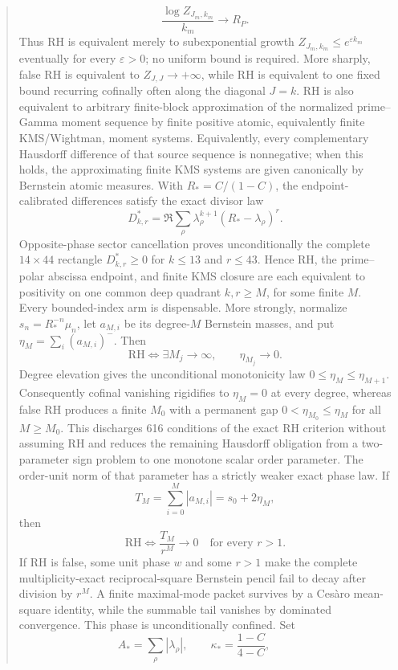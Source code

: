\documentclass[11pt]{article}
\begin{document}
\begin{abstract}
\[
 \frac{\log Z_{J_m,k_m}}{k_m}\longrightarrow R_P.
\]
Thus RH is equivalent merely to subexponential growth
$Z_{J_m,k_m}\le e^{\varepsilon k_m}$ eventually for every $\varepsilon>0$; no uniform bound is
required.  More sharply, false RH is equivalent to \(Z_{J,J}\to+\infty\), while RH is equivalent
to one fixed bound recurring cofinally often along the diagonal \(J=k\).  RH is also equivalent
to arbitrary finite-block
approximation of the normalized prime--Gamma moment sequence by finite positive atomic,
equivalently finite KMS/Wightman, moment systems.  Equivalently, every complementary Hausdorff
difference of that source sequence is nonnegative; when this holds, the approximating finite KMS
systems are given canonically by Bernstein atomic measures.  With $R_*=C/(1-C)$, the
endpoint-calibrated differences satisfy the exact divisor law
\[
 D^*_{k,r}=\Re\sum_\rho
 \lambda_\rho^{k+1}(R_*-\lambda_\rho)^r.
\]
Opposite-phase sector cancellation proves unconditionally the complete $14\times44$ rectangle
$D^*_{k,r}\ge0$ for $k\le13$ and $r\le43$.  Hence RH, the prime--polar abscissa endpoint, and
finite KMS closure are each equivalent to positivity on one common deep quadrant $k,r\ge M$, for
some finite $M$.  Every bounded-index arm is dispensable.  More strongly, normalize
$s_n=R_*^{-n}\mu_n$, let $a_{M,i}$ be its degree-$M$ Bernstein masses, and put
$\eta_M=\sum_i(a_{M,i})^-$.  Then
\[
 \mathrm{RH}\Longleftrightarrow
 \exists M_j\to\infty,\qquad \eta_{M_j}\longrightarrow0.
\]
Degree elevation gives the unconditional monotonicity law $0\le\eta_M\le\eta_{M+1}$.
Consequently cofinal vanishing rigidifies to $\eta_M=0$ at every degree, whereas false RH
produces a finite $M_0$ with a permanent gap
$0<\eta_{M_0}\le\eta_M$ for all $M\ge M_0$.  This discharges 616 conditions of the exact RH
criterion without assuming RH and reduces the remaining Hausdorff obligation from a
two-parameter sign problem to one monotone scalar order parameter.  The order-unit norm of that
parameter has a strictly weaker exact phase law.  If
\[
 T_M=\sum_{i=0}^M|a_{M,i}|=s_0+2\eta_M,
\]
then
\[
 \mathrm{RH}\Longleftrightarrow
 \frac{T_M}{r^M}\longrightarrow0\quad\text{for every }r>1.
\]
If RH is false, some unit phase $w$ and some $r>1$ make the complete multiplicity-exact
reciprocal-square Bernstein pencil fail to decay after division by $r^M$.  A finite maximal-mode
packet survives by a Ces\`aro mean-square identity, while the summable tail vanishes by dominated
convergence.  This phase is unconditionally confined.  Set
\[
 A_*=\sum_\rho|\lambda_\rho|,\qquad
 \kappa_*=\frac{1-C}{4-C},\qquad
\]
\end{abstract}
\end{document}
